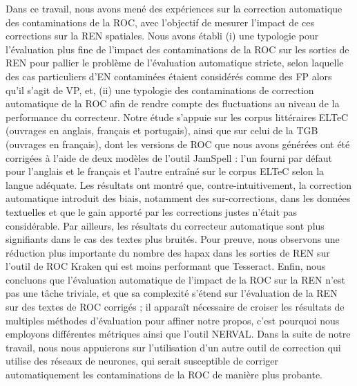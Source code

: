 Dans ce travail, nous avons mené des expériences sur la correction automatique des contaminations de la ROC, avec l'objectif de mesurer l'impact de ces corrections sur la REN spatiales. Nous avons établi (i) une typologie pour l'évaluation plus fine de l'impact des contaminations de la ROC sur les sorties de REN pour pallier le problème de l'évaluation automatique stricte, selon laquelle des cas particuliers d'EN contaminées étaient considérés comme des FP alors qu'il s'agit de VP, et, (ii) une typologie des contaminations de correction automatique de la ROC afin de rendre compte des fluctuations au niveau de la performance du correcteur. Notre étude s'appuie sur les corpus littéraires ELTeC (ouvrages en anglais, français et portugais), ainsi que sur celui de la TGB (ouvrages en français), dont les versions de ROC que nous avons générées ont été corrigées à l'aide de deux modèles de l'outil JamSpell : l'un fourni par défaut pour l'anglais et le français et l'autre entraîné sur le corpus ELTeC selon la langue adéquate. Les résultats ont montré que, contre-intuitivement, la correction automatique introduit des biais, notamment des sur-corrections, dans les données textuelles et que le gain apporté par les corrections justes n'était pas considérable.  Par ailleurs, les résultats du correcteur automatique sont plus signifiants dans le cas des textes plus bruités. Pour preuve, nous observons une réduction plus importante du nombre des hapax dans les sorties de REN sur l'outil de ROC Kraken qui est moins performant que Tesseract. Enfin, nous concluons que l'évaluation automatique de l'impact de la ROC sur la REN n'est pas une tâche triviale, et que sa complexité s'étend sur l'évaluation de la REN sur des textes de ROC corrigés ; il apparaît nécessaire de croiser les résultats de multiples méthodes d'évaluation pour affiner notre propos, c'est pourquoi nous employons différentes métriques ainsi que l'outil \textsc{NERVAL}. Dans la suite de notre travail, nous nous appuierons sur l'utilisation d'un autre outil de correction qui utilise des réseaux de neurones, qui serait susceptible de corriger automatiquement les contaminations de la ROC de manière plus probante.


